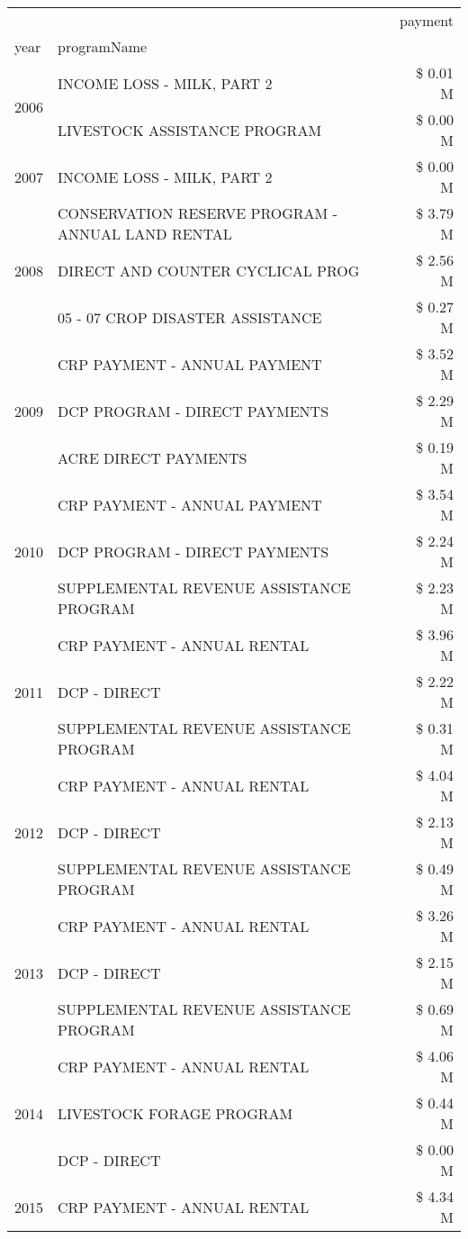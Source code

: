 \begin{tabular}{llr}
\toprule
 &  & payment \\
year & programName &  \\
\midrule
\multirow[t]{2}{*}{2006} & INCOME LOSS - MILK, PART 2 & \$ 0.01 M \\
 & LIVESTOCK ASSISTANCE PROGRAM & \$ 0.00 M \\
\cline{1-3}
2007 & INCOME LOSS - MILK, PART 2 & \$ 0.00 M \\
\cline{1-3}
\multirow[t]{3}{*}{2008} & CONSERVATION RESERVE PROGRAM - ANNUAL LAND RENTAL & \$ 3.79 M \\
 & DIRECT AND COUNTER CYCLICAL PROG & \$ 2.56 M \\
 & 05 - 07 CROP DISASTER ASSISTANCE & \$ 0.27 M \\
\cline{1-3}
\multirow[t]{3}{*}{2009} & CRP PAYMENT - ANNUAL PAYMENT & \$ 3.52 M \\
 & DCP PROGRAM - DIRECT PAYMENTS & \$ 2.29 M \\
 & ACRE DIRECT PAYMENTS & \$ 0.19 M \\
\cline{1-3}
\multirow[t]{3}{*}{2010} & CRP PAYMENT - ANNUAL PAYMENT & \$ 3.54 M \\
 & DCP PROGRAM - DIRECT PAYMENTS & \$ 2.24 M \\
 & SUPPLEMENTAL REVENUE ASSISTANCE PROGRAM & \$ 2.23 M \\
\cline{1-3}
\multirow[t]{3}{*}{2011} & CRP PAYMENT - ANNUAL RENTAL & \$ 3.96 M \\
 & DCP - DIRECT & \$ 2.22 M \\
 & SUPPLEMENTAL REVENUE ASSISTANCE PROGRAM & \$ 0.31 M \\
\cline{1-3}
\multirow[t]{3}{*}{2012} & CRP PAYMENT - ANNUAL RENTAL & \$ 4.04 M \\
 & DCP - DIRECT & \$ 2.13 M \\
 & SUPPLEMENTAL REVENUE ASSISTANCE PROGRAM & \$ 0.49 M \\
\cline{1-3}
\multirow[t]{3}{*}{2013} & CRP PAYMENT - ANNUAL RENTAL & \$ 3.26 M \\
 & DCP - DIRECT & \$ 2.15 M \\
 & SUPPLEMENTAL REVENUE ASSISTANCE PROGRAM & \$ 0.69 M \\
\cline{1-3}
\multirow[t]{3}{*}{2014} & CRP PAYMENT - ANNUAL RENTAL & \$ 4.06 M \\
 & LIVESTOCK FORAGE PROGRAM & \$ 0.44 M \\
 & DCP - DIRECT & \$ 0.00 M \\
\cline{1-3}
\multirow[t]{3}{*}{2015} & CRP PAYMENT - ANNUAL RENTAL & \$ 4.34 M \\

\end{tabular}
